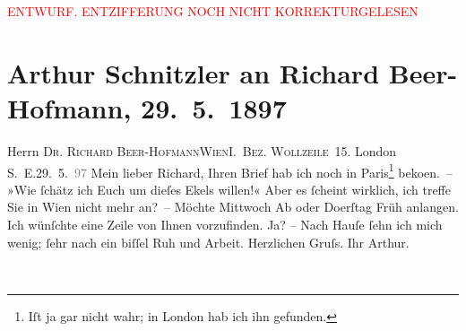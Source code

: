 
\begin{center}
            \textcolor{red}{ENTWURF. ENTZIFFERUNG NOCH NICHT KORREKTURGELESEN}
                      \end{center}
            
               \section[Arthur Schnitzler an Richard Beer-Hofmann, 29. 5. 1897]{ Arthur Schnitzler an Richard Beer-Hofmann, 29. 5. 1897}\nopagebreak{}\rehead{ }\begin{ledgroupsized}[t]{13cm}\normalsize\beginnumbering{} \toendnotes[C]{\smallbreak\pagebreak[2]} 
\pstart{}{\pb}Herrn \textsc{Dr. Richard
                     Beer-Hofmann}\pend{}\pstart{}\textsc{Wien}\pend{}\pstart{}\textsc{I. Bez. Wollzeile 15}.\pend{}{\bigskip}\pstart
           \raggedleft{}{\pb}London S. E.29. 5. \textcolor{gray}{97}\pend
           \pstart
           Mein lieber Richard, Ihren Brief hab ich noch in Paris\footnote{\noindent{}Iſt ja gar nicht wahr; in London hab ich ihn
                     gefunden.} beko{\geminationm}en. – »Wie ſchätz ich Euch um dieſes
               Ekels willen!«\pend
           \pstart
           Aber es ſcheint wirklich, ich treffe Sie in Wien
               nicht mehr an? – Möchte Mittwoch{ }\introOben{}Ab\introOben{} oder Do{\geminationn}erſtag{ }Früh anlangen. Ich wünſchte eine Zeile von Ihnen vorzufinden. Ja? – Nach
               Hauſe ſehn ich mich wenig; ſehr nach ein biſſel Ruh und Arbeit.\pend
           \pstart Herzlichen Gruſs. Ihr \spacefill\mbox{Arthur.}\pend{}\endnumbering{}\end{ledgroupsized}  \newcommand{\dateiname}{L00681}\newcommand{\titel}{Arthur Schnitzler an Richard Beer-Hofmann, 29. 5. 1897}\newcommand{\editorInnen}{Martin Anton Müller und Gerd-Hermann Susen}
      